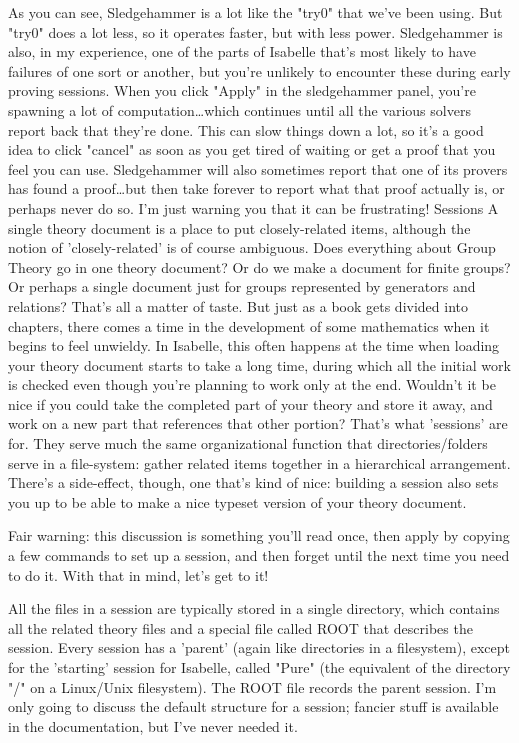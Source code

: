 As you can see, Sledgehammer is a lot like the "try0" that we've been using. But "try0" does a lot less, so it operates faster, but with less power.  Sledgehammer is also, in my experience, one of the parts of Isabelle that's most likely to have failures of one sort or another, but you're unlikely to encounter these during early proving sessions. When you click "Apply" in the sledgehammer panel, you're spawning a lot of computation…which continues until all the various solvers report back that they're done. This can slow things down a lot, so it's a good idea to click "cancel" as soon as you get tired of waiting or get a proof that you feel you can use. Sledgehammer will also sometimes report that one of its provers has found a proof…but then take forever to report what that proof actually is, or perhaps never do so. I'm just warning you that it can be frustrating! 
Sessions
A single theory document is a place to put closely-related items, although the notion of 'closely-related' is of course ambiguous. Does everything about Group Theory go in one theory document? Or do we make a document for finite groups? Or perhaps a single document just for groups represented by generators and relations? That's all a matter of taste. But just as a book gets divided into chapters, there comes a time in the development of some mathematics when it begins to feel unwieldy. In Isabelle, this often happens at the time when loading your theory document starts to take a long time, during which all the initial work is checked even though you're planning to work only at the end. Wouldn't it be nice if you could take the completed part of your theory and store it away, and work on a new part that references that other portion? That's what 'sessions' are for. They serve much the same organizational function that directories/folders serve in a file-system: gather related items together in a hierarchical arrangement. There's a side-effect, though, one that's kind of nice: building a session also sets you up to be able to make a nice typeset version of your theory document. 

Fair warning: this discussion is something you'll read once, then apply by copying a few commands to set up a session, and then forget until the next time you need to do it. With that in mind, let's get to it!

All the files in a session are typically stored in a single directory, which contains all the related theory files and a special file called ROOT that describes the session. Every session has a 'parent' (again like directories in a filesystem), except for the 'starting' session for Isabelle, called "Pure" (the equivalent of the directory "/" on a Linux/Unix filesystem). The ROOT file records the parent session. I'm only going to discuss the default structure for a session; fancier stuff is available in the documentation, but I've never needed it. 

